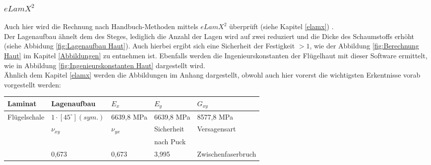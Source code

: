 \subsubsection{$eLamX^{2}$}

Auch hier wird die Rechnung nach Handbuch-Methoden mittels $eLamX^{2}$ überprüft (siehe Kapitel \ref{elamx}) \cite{item22}\cite{item3}. \\

\noindent Der Lagenaufbau ähnelt dem des Steges, lediglich die Anzahl der Lagen wird auf zwei reduziert und die Dicke des Schaumstoffs erhöht (siehe Abbidung \ref{fig:Lagenaufbau Haut}). Auch hierbei ergibt sich eine Sicherheit der Festigkeit $>1$, wie der Abbildung \ref{fig:Berechnung Haut} im  Kapitel \ref{Abbildungen} zu entnehmen ist. Ebenfalls werden die Ingenieurskonstanten der Flügelhaut mit dieser Software ermittelt, wie in Abbildung \ref{fig:Ingenieurskonstanten Haut} dargestellt wird.\\

\noindent Ähnlich dem Kapitel \ref{elamx} werden die Abbildungen im Anhang dargestellt, obwohl auch hier vorerst die wichtigsten Erkentnisse vorab vorgestellt werden:

\begin{longtable}{lllll}
	
	Laminat&Lagenaufbau&$E_{x}$&$E_{y}$&$G_{xy}$\\
	\hline
	Flügelschale&$1\cdot[45^{\circ}](sym.)$&6639,8 MPa&6639,8 MPa&8577,8 MPa\\
	\hline
	&$\nu_{xy}$&$\nu_{yx}$&Sicherheit&Versagensart\\
	&&&nach Puck&\\
	\cline{2-5}
	&0,673&0,673&3,995&Zwischenfaserbruch\\
\end{longtable}